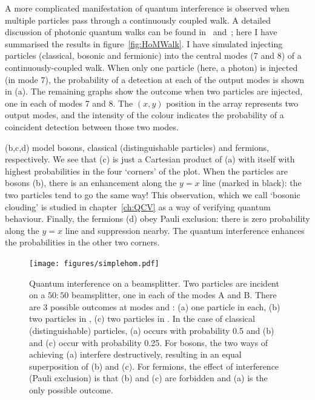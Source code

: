 A more complicated manifestation of quantum interference is observed when
multiple particles pass through a continuously coupled walk. A detailed
discussion of photonic quantum walks can be found in~\cite{walks-peruzzo}
and~\cite{walks-jasmin}; here I have summarised the results in
figure~\ref{fig:HoMWalk}. I have simulated injecting particles (classical,
bosonic and fermionic) into the central modes (7 and 8) of a
continuously-coupled walk. When only one particle (here, a photon) is injected
(in mode 7), the probability of a detection at each of the output modes is shown
in (a). The remaining graphs show the outcome when two particles are injected,
one in each of modes 7 and 8. The \(\left(x,y\right)\) position in the array
represents two output modes, and the intensity of the colour indicates the
probability of a coincident detection between those two modes.

(b,c,d) model bosons, classical (distinguishable particles) and fermions,
respectively. We see that (c) is just a Cartesian product of (a) with itself
with highest probabilities in the four `corners' of the plot. When the particles
are bosons (b), there is an enhancement along the \(y=x\) line (marked in
black): the two particles tend to go the same way! This observation, which we
call `bosonic clouding' is studied in chapter~\ref{ch:QCV} as a way of verifying
quantum behaviour. Finally, the fermions (d) obey Pauli exclusion: there is
zero probability along the \(y=x\) line and suppression nearby. The quantum
interference enhances the probabilities in the other two corners.

\begin{figure}
  \centering
  \texttt{[image: figures/simplehom.pdf]}
  \caption[Quantum interference on a beamsplitter]
  {Quantum interference on a beamsplitter. Two particles are incident on a
  \(50:50\) beamsplitter, one in each of the modes A and B. There are 3 possible
  outcomes at modes \aprime{} and \bprime{}: (a) one particle in each,
  (b) two particles in \aprime{}, (c) two particles in \bprime{}. In
  the case of classical (distinguishable) particles, (a) occurs with probability
  0.5 and (b) and (c) occur with probability 0.25. For bosons, the two ways of
  achieving (a) interfere destructively, resulting in an equal superposition of
  (b) and (c). For fermions, the effect of interference (Pauli exclusion) is
  that (b) and (c) are forbidden and (a) is the only possible outcome.}
  \label{fig:SimpleHoM}
\end{figure}

